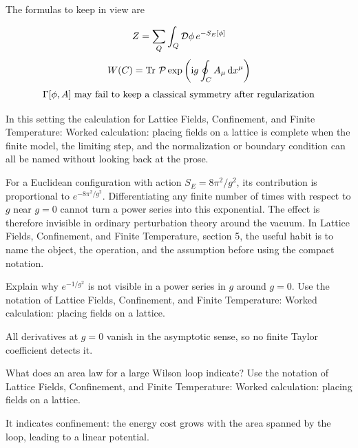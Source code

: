 The formulas to keep in view are

\[
  Z=\sum_Q\int_Q\mathcal D\phi\,e^{-S_E[\phi]}
\]
\[
  W(C)=\operatorname{Tr}\,\mathcal P\exp\left(\mathrm i g\oint_C A_\mu\,\mathrm d x^\mu\right)
\]
\[
  \Gamma[\phi,A]\hbox{ may fail to keep a classical symmetry after regularization}
\]

In this setting the calculation for Lattice Fields, Confinement, and Finite Temperature: Worked calculation: placing fields on a lattice is complete when the finite model, the limiting step, and the normalization or boundary condition can all be named without looking back at the prose.




\begin{example}
For a Euclidean configuration with action \(S_E=8\pi^2/g^2\), its contribution is proportional to \(e^{-8\pi^2/g^2}\).  Differentiating any finite number of times with respect to \(g\) near \(g=0\) cannot turn a power series into this exponential.  The effect is therefore invisible in ordinary perturbation theory around the vacuum.  In Lattice Fields, Confinement, and Finite Temperature, section 5, the useful habit is to name the object, the operation, and the assumption before using the compact notation.
\end{example}



\begin{exercise}
Explain why \(e^{-1/g^2}\) is not visible in a power series in \(g\) around \(g=0\).  Use the notation of Lattice Fields, Confinement, and Finite Temperature: Worked calculation: placing fields on a lattice.
\begin{answer}
All derivatives at \(g=0\) vanish in the asymptotic sense, so no finite Taylor coefficient detects it.
\end{answer}
\end{exercise}

\begin{exercise}
What does an area law for a large Wilson loop indicate?  Use the notation of Lattice Fields, Confinement, and Finite Temperature: Worked calculation: placing fields on a lattice.
\begin{answer}
It indicates confinement: the energy cost grows with the area spanned by the loop, leading to a linear potential.
\end{answer}
\end{exercise}



